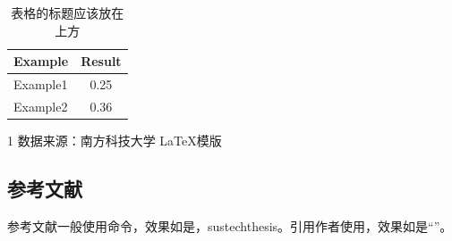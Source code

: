 \begin{table}[htb]
    \centering
    \caption{表格的标题应该放在上方}
    \label{table}
    \begin{tabular}{lc} %
        \toprule
        Example & Result \\
        \midrule
        Example1          & 0.25 \\
        Example2          & 0.36 \\
        \bottomrule
    \end{tabular}
\end{table}

\begin{table}[htb]
    \centering
    \caption{带表注的表格的标题}
    \label{table2}
    \begin{threeparttable}
        \begin{tablenotes}
            \item[1] 数据来源：南方科技大学 \LaTeX 模版 %
        \end{tablenotes}
    \end{threeparttable}
\end{table}

\subsection{参考文献}

参考文献一般使用命令，效果如是\cite{Nicholas1998Handbook}，sustechthesis\cite{sustechthesis}。引用作者使用，效果如是“\citeauthor{goossens1994latex}”。
